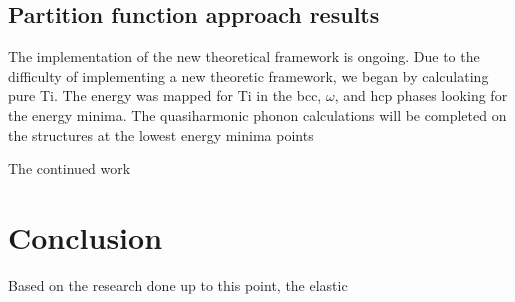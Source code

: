 \subsection{Partition function approach results}

The implementation of the new theoretical framework is ongoing. Due to the difficulty of implementing a new theoretic framework, we began by calculating pure Ti. The energy was mapped for Ti in the bcc, $\omega$, and hcp phases looking for the energy minima. The quasiharmonic phonon calculations will be completed on the structures at the lowest energy minima points   

The continued work 

\section{Conclusion}

Based on the research done up to this point, the elastic 

